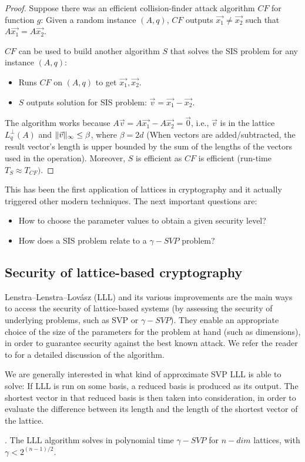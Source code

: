 \begin{proof}
  Suppose there was an efficient collision-finder attack algorithm $CF$ for
  function $g$: Given a random instance $(A,q)$, $CF$ outputs
  $\vec{x_1} \neq \vec{x_2}$ such that $A\vec{x_1} = A\vec{x_2}$.

$CF$ can be used to build another algorithm $S$ that solves the SIS problem
  for any instance $(A,q)$:
  \begin{itemize}
  \item Runs $CF$ on $(A,q)$ to get $\vec{x_1},\vec{x_2}$.
  \item $S$ outputs solution for SIS problem: $\vec{v} = \vec{x_1} - \vec{x_2}$.
  \end{itemize}

  The algorithm works because $A\vec{v} = A\vec{x_1} - A\vec{x_2} = \vec{0}$,
  i.e., $\vec{v}$ is in the lattice $L_q^\bot(A)$ and
  $\Vert \vec{v} \Vert_{\infty} \leq \beta$, where $\beta = 2d$ (When vectors are added/subtracted, the result vector's length is upper bounded by the sum of the lengths
  of the vectors used in the operation). Moreover, $S$ is efficient as $CF$ is efficient (run-time
  $T_S \approx T_{CF})$.
\end{proof}
This has been the first application of lattices in cryptography and it actually
triggered other modern techniques. The next important questions are:
\begin{itemize}
\item How to choose the parameter values to obtain a given security level?
\item How does a SIS problem relate to a $\gamma-SVP$ problem?
\end{itemize}

\subsection{Security of lattice-based cryptography}
\label{sec:latticeSecurity}

Lenstra–Lenstra–Lovász (LLL) and its various improvements are the main ways to
access the security of lattice-based systems (by assessing the security of
underlying problems, such as SVP or $\gamma-SVP$). They enable an appropriate choice of the size of the parameters for the problem at hand (such as dimensions), in order
to guarantee security against the best known attack. We refer the reader to \cite{nguyen2009lll} for a detailed discussion of the algorithm.

We are generally interested in what kind of
approximate SVP LLL is able to solve: If LLL is run on some basis, a
reduced basis is produced as its output. The shortest vector in that reduced basis is then taken into consideration, in order to evaluate the difference between its length and the length of the shortest vector of the lattice.
\begin{theorem}
  . The LLL algorithm solves in polynomial time
  $\gamma-SVP$ for $n-dim$ lattices, with $\gamma < 2^{(n-1)/2}$.
  \label{theo:LLLShortVector}
\end{theorem}

